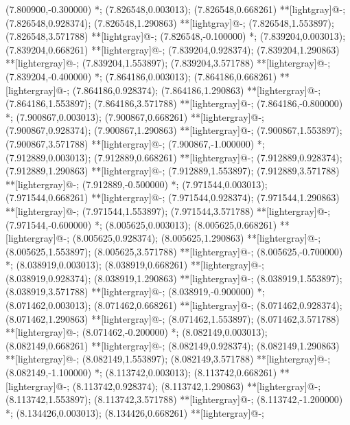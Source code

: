 (7.800900,-0.300000) *{};
(7.826548,0.003013); (7.826548,0.668261) **[lightgray]@{-};
(7.826548,0.928374); (7.826548,1.290863) **[lightgray]@{-};
(7.826548,1.553897); (7.826548,3.571788) **[lightgray]@{-};
(7.826548,-0.100000) *{};
(7.839204,0.003013); (7.839204,0.668261) **[lightergray]@{-};
(7.839204,0.928374); (7.839204,1.290863) **[lightergray]@{-};
(7.839204,1.553897); (7.839204,3.571788) **[lightergray]@{-};
(7.839204,-0.400000) *{};
(7.864186,0.003013); (7.864186,0.668261) **[lightergray]@{-};
(7.864186,0.928374); (7.864186,1.290863) **[lightergray]@{-};
(7.864186,1.553897); (7.864186,3.571788) **[lightergray]@{-};
(7.864186,-0.800000) *{};
(7.900867,0.003013); (7.900867,0.668261) **[lightergray]@{-};
(7.900867,0.928374); (7.900867,1.290863) **[lightergray]@{-};
(7.900867,1.553897); (7.900867,3.571788) **[lightergray]@{-};
(7.900867,-1.000000) *{};
(7.912889,0.003013); (7.912889,0.668261) **[lightergray]@{-};
(7.912889,0.928374); (7.912889,1.290863) **[lightergray]@{-};
(7.912889,1.553897); (7.912889,3.571788) **[lightergray]@{-};
(7.912889,-0.500000) *{};
(7.971544,0.003013); (7.971544,0.668261) **[lightergray]@{-};
(7.971544,0.928374); (7.971544,1.290863) **[lightergray]@{-};
(7.971544,1.553897); (7.971544,3.571788) **[lightergray]@{-};
(7.971544,-0.600000) *{};
(8.005625,0.003013); (8.005625,0.668261) **[lightergray]@{-};
(8.005625,0.928374); (8.005625,1.290863) **[lightergray]@{-};
(8.005625,1.553897); (8.005625,3.571788) **[lightergray]@{-};
(8.005625,-0.700000) *{};
(8.038919,0.003013); (8.038919,0.668261) **[lightergray]@{-};
(8.038919,0.928374); (8.038919,1.290863) **[lightergray]@{-};
(8.038919,1.553897); (8.038919,3.571788) **[lightergray]@{-};
(8.038919,-0.900000) *{};
(8.071462,0.003013); (8.071462,0.668261) **[lightergray]@{-};
(8.071462,0.928374); (8.071462,1.290863) **[lightergray]@{-};
(8.071462,1.553897); (8.071462,3.571788) **[lightergray]@{-};
(8.071462,-0.200000) *{};
(8.082149,0.003013); (8.082149,0.668261) **[lightergray]@{-};
(8.082149,0.928374); (8.082149,1.290863) **[lightergray]@{-};
(8.082149,1.553897); (8.082149,3.571788) **[lightergray]@{-};
(8.082149,-1.100000) *{};
(8.113742,0.003013); (8.113742,0.668261) **[lightergray]@{-};
(8.113742,0.928374); (8.113742,1.290863) **[lightergray]@{-};
(8.113742,1.553897); (8.113742,3.571788) **[lightergray]@{-};
(8.113742,-1.200000) *{};
(8.134426,0.003013); (8.134426,0.668261) **[lightergray]@{-};
